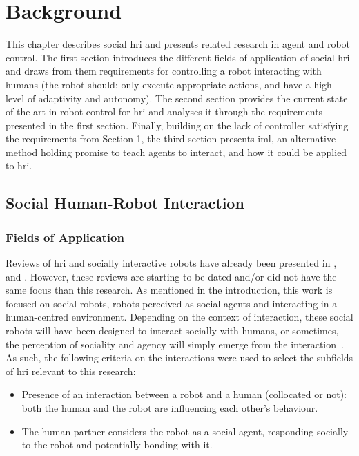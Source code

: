 \chapter{Background} \label{chap:background}
\glsresetall

This chapter describes social \gls{hri} and presents related research in agent and robot control. The first section introduces the different fields of application of social \gls{hri} and draws from them requirements for controlling a robot interacting with humans (the robot should: only execute appropriate actions, and have a high level of adaptivity and autonomy). The second section provides the current state of the art in robot control for \gls{hri} and analyses it through the requirements presented in the first section. Finally, building on the lack of controller satisfying the requirements from Section 1, the third section presents \gls{iml}, an alternative method holding promise to teach agents to interact, and how it could be applied to \gls{hri}.

\section{Social Human-Robot Interaction}

\subsection{Fields of Application} \label{ssec:back_hri}

Reviews of \gls{hri} and socially interactive robots have already been presented in \cite{fong2003survey}, \cite{goodrich2007human} and \cite{sheridan2016human}. However, these reviews are starting to be dated and/or did not have the same focus than this research. As mentioned in the introduction, this work is focused on social robots, robots perceived as social agents and interacting in a human-centred environment. Depending on the context of interaction, these social robots will have been designed to interact socially with humans, or sometimes, the perception of sociality and agency will simply emerge from the interaction~\citep{fincannon2004evidence}. As such, the following criteria on the interactions were used to select the subfields of \gls{hri} relevant to this research:
\begin{itemize}
	\item Presence of an interaction between a robot and a human (collocated or not): both the human and the robot are influencing each other's behaviour.
	\item The human partner considers the robot as a social agent, responding socially to the robot and potentially bonding with it.
\end{itemize}

